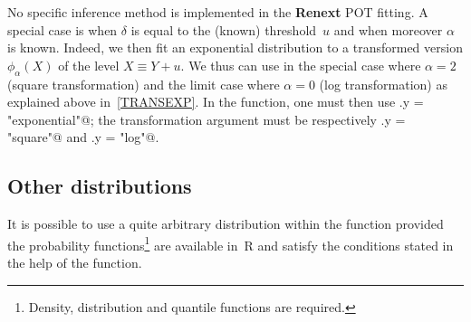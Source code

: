 \documentclass[a4paper]{report}
\newcommand{\pkg}[1]{\textbf{#1}}
\begin{document}
No specific inference method is implemented in the \pkg{Renext} POT
fitting. A special case is when $\delta$ is equal to the (known) threshold~$u$
and when moreover $\alpha$ is known. Indeed, we then fit an exponential distribution 
to a transformed  version $\phi_\alpha(X)$ of the level $X \equiv Y +u$.
We thus can use in the special case where $\alpha=2$ (square transformation)
and the limit case where $\alpha = 0$ (log transformation) as explained
above in~\ref{TRANSEXP}.
In the \verb@Renouv@ function, one must then use
\verb@distname.y = "exponential"@; the transformation argument 
must be respectively \verb@trans.y = "square"@ and \verb@trans.y = "log"@. 


\subsection{Other distributions}
It is possible to use a quite arbitrary distribution within the \verb@Renouv@
function provided the probability functions\footnote{Density, distribution and quantile
functions are required.}
are available in~R and satisfy the conditions stated in the help of the \verb@Renouv@ 
function.






\printindex
\end{document}
